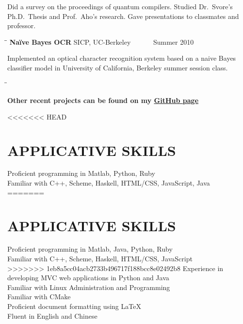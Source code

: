 \documentclass{res}
\begin{document}
\begin{resume}
    Did a survey on the proceedings of quantum compilers. Studied Dr.\ Svore's Ph.D.\ Thesis and Prof.\ Aho's research. Gave presentations to classmates and  professor.
      \begin{tabbing}%
   \hspace{2.3in}\= \hspace{2.6in}\= \kill %
   {\bf Na\"{i}ve Bayes OCR}  \>SICP, UC-Berkeley\> ~~~~~~Summer 2010\\
   \end{tabbing}\vspace{-20pt}
    Implemented an optical character recognition system based on a naive Bayes classifier model in University of California, Berkeley summer session class. 
    \begin{tabbing}
   \hspace{2.3in}\= \hspace{2.6in}\= \kill %
 
    {\bf Other recent projects can be found on my \href{https://github.com/tingleshao}{\underline{GitHub page}}} 
  \end{tabbing}
  
  

<<<<<<< HEAD


\section{APPLICATIVE SKILLS}
    \vspace{0.05in}
    Proficient programming in Matlab, Python, Ruby  \\
    Familiar with C++, Scheme, Haskell, HTML/CSS, JavaScript, Java\\
=======
\section{APPLICATIVE SKILLS}      
    \vspace{0.05in}    
    Proficient programming in Matlab, Java, Python, Ruby  \\
    Familiar with C++, Scheme, Haskell, HTML/CSS, JavaScript\\
>>>>>>> 1eb8a5cc04acb2733b496717f188bcc8e02492b8
    Experience in developing MVC web applications in Python and Java\\
    Familiar with Linux Administration and Programming \\ 
    Familiar with CMake\\
    Proficient document formatting using \LaTeX \\
    Fluent in English and Chinese
    

\end{resume}
\end{document}
